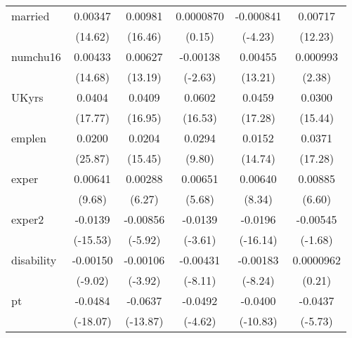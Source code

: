 \begin{table}[htbp]
\begin{tabular}{l*{5}{c}}
married     &     0.00347\sym{***}&     0.00981\sym{***}&   0.0000870         &   -0.000841\sym{***}&     0.00717\sym{***}\\
            &     (14.62)         &     (16.46)         &      (0.15)         &     (-4.23)         &     (12.23)         \\
numchu16    &     0.00433\sym{***}&     0.00627\sym{***}&    -0.00138\sym{**} &     0.00455\sym{***}&    0.000993\sym{*}  \\
            &     (14.68)         &     (13.19)         &     (-2.63)         &     (13.21)         &      (2.38)         \\
UKyrs       &      0.0404\sym{***}&      0.0409\sym{***}&      0.0602\sym{***}&      0.0459\sym{***}&      0.0300\sym{***}\\
            &     (17.77)         &     (16.95)         &     (16.53)         &     (17.28)         &     (15.44)         \\
emplen      &      0.0200\sym{***}&      0.0204\sym{***}&      0.0294\sym{***}&      0.0152\sym{***}&      0.0371\sym{***}\\
            &     (25.87)         &     (15.45)         &      (9.80)         &     (14.74)         &     (17.28)         \\
exper       &     0.00641\sym{***}&     0.00288\sym{***}&     0.00651\sym{***}&     0.00640\sym{***}&     0.00885\sym{***}\\
            &      (9.68)         &      (6.27)         &      (5.68)         &      (8.34)         &      (6.60)         \\
exper2      &     -0.0139\sym{***}&    -0.00856\sym{***}&     -0.0139\sym{***}&     -0.0196\sym{***}&    -0.00545         \\
            &    (-15.53)         &     (-5.92)         &     (-3.61)         &    (-16.14)         &     (-1.68)         \\
disability  &    -0.00150\sym{***}&    -0.00106\sym{***}&    -0.00431\sym{***}&    -0.00183\sym{***}&   0.0000962         \\
            &     (-9.02)         &     (-3.92)         &     (-8.11)         &     (-8.24)         &      (0.21)         \\
pt          &     -0.0484\sym{***}&     -0.0637\sym{***}&     -0.0492\sym{***}&     -0.0400\sym{***}&     -0.0437\sym{***}\\
            &    (-18.07)         &    (-13.87)         &     (-4.62)         &    (-10.83)         &     (-5.73)         \\

\end{tabular}
\end{table}

